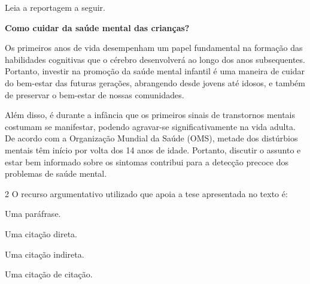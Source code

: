 
Leia a reportagem a seguir.


\begin{myquote}
\begin{center}
\textbf{Como cuidar da saúde mental das crianças?}
\end{center}

\noindent Os primeiros anos de vida desempenham um papel fundamental na formação
das habilidades cognitivas que o cérebro desenvolverá ao longo dos anos
subsequentes. Portanto, investir na promoção da saúde mental infantil é
uma maneira de cuidar do bem-estar das futuras gerações, abrangendo
desde jovens até idosos, e também de preservar o bem-estar de nossas
comunidades.

Além disso, é durante a infância que os primeiros sinais de transtornos
mentais costumam se manifestar, podendo agravar-se significativamente na
vida adulta. De acordo com a Organização Mundial da Saúde (OMS), metade
dos distúrbios mentais têm início por volta dos 14 anos de idade.
Portanto, discutir o assunto e estar bem informado sobre os sintomas
contribui para a detecção precoce dos problemas de saúde mental.

\end{myquote}

\num{2}  O recurso argumentativo utilizado que apoia a tese apresentada no texto é:

\begin{escolha}
\item Uma paráfrase.
\item Uma citação direta.
\item Uma citação indireta. 
\item Uma citação de citação.
\end{escolha}

